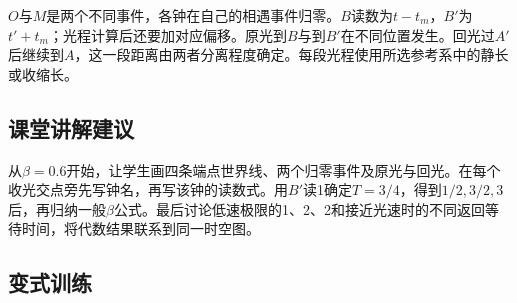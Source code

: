 \documentclass[UTF8,fontset=fandol,a4paper,11pt]{ctexart}
\begin{document}
$O$与$M$是两个不同事件，各钟在自己的相遇事件归零。$B$读数为$t-t_m$，$B'$为$t'+t_m$；光程计算后还要加对应偏移。原光到$B$与到$B'$在不同位置发生。回光过$A'$后继续到$A$，这一段距离由两者分离程度确定。每段光程使用所选参考系中的静长或收缩长。



\subsection*{课堂讲解建议}

从$\beta=0.6$开始，让学生画四条端点世界线、两个归零事件及原光与回光。在每个收光交点旁先写钟名，再写该钟的读数式。用$B'$读1确定$T=3/4$，得到$1/2,3/2,3$后，再归纳一般$\beta$公式。最后讨论低速极限的1、2、2和接近光速时的不同返回等待时间，将代数结果联系到同一时空图。



\subsection*{变式训练}
\end{document}
